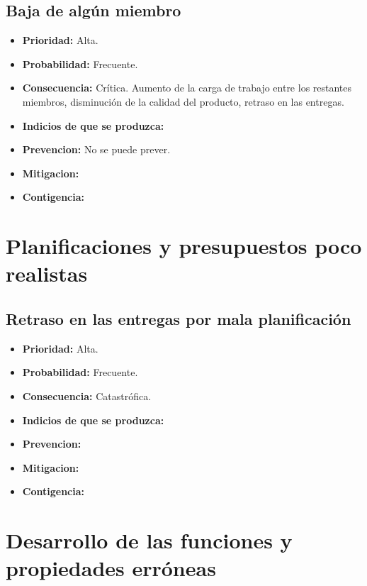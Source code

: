 \documentclass[spanish,a4paper,12pt]{report}	%
\begin{document}
\subsection*{Baja de algún miembro}			%
	\begin{itemize}
		\item \textbf {Prioridad: }Alta.
		\item \textbf {Probabilidad: }Frecuente.
		\item \textbf {Consecuencia: }Crítica. Aumento de la carga de trabajo entre los restantes miembros, disminución de la calidad del producto, retraso en las entregas.
		\item \textbf {Indicios de que se produzca: }
		\item \textbf {Prevencion: }No se puede prever.
		\item \textbf {Mitigacion: }
		\item \textbf {Contigencia: }
	\end{itemize}

%
\section{Planificaciones y presupuestos poco realistas}
\subsection*{Retraso en las entregas por mala planificación}			%
	\begin{itemize}
		\item \textbf {Prioridad: }Alta.
		\item \textbf {Probabilidad: }Frecuente.
		\item \textbf {Consecuencia: }Catastrófica.
		\item \textbf {Indicios de que se produzca: }
		\item \textbf {Prevencion: }
		\item \textbf {Mitigacion: }
		\item \textbf {Contigencia: }
	\end{itemize}

%
\section{Desarrollo de las funciones y propiedades erróneas}
\end{document}
